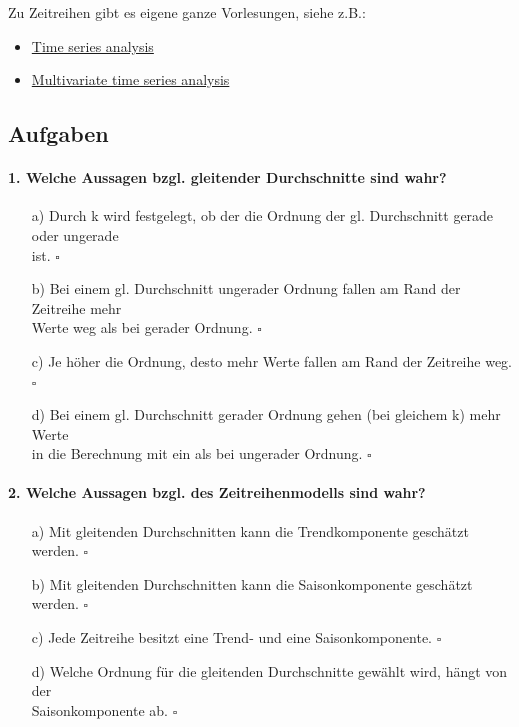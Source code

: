 \documentclass[a4paper]{article}
\begin{document}
Zu Zeitreihen gibt es eigene ganze Vorlesungen, siehe z.B.:

\begin{itemize}
    \item \href{https://www.finmetrics.statistik.uni-muenchen.de/studium_lehre/sommersemester-2020/tsa_19/index.html}{Time series analysis}
    \item \href{https://www.finmetrics.statistik.uni-muenchen.de/studium_lehre/sommersemester-2020/mtsa_2020/index.html}{Multivariate time series analysis}
\end{itemize}

\clearpage

\subsection{Aufgaben}

\paragraph{1. Welche Aussagen bzgl. gleitender Durchschnitte sind wahr?}

\begin{itemize}
    \item[a)] Durch k wird festgelegt, ob der die Ordnung der gl. Durchschnitt gerade oder ungerade\\ist. \hfill $\square$
    \item[b)] Bei einem gl. Durchschnitt ungerader Ordnung fallen am Rand der Zeitreihe mehr\\Werte weg als bei gerader Ordnung. \hfill $\square$
    \item[c)] Je höher die Ordnung, desto mehr Werte fallen am Rand der Zeitreihe weg. \hfill $\square$
    \item[d)] Bei einem gl. Durchschnitt gerader Ordnung gehen (bei gleichem k) mehr Werte\\in die Berechnung mit ein als bei ungerader Ordnung. \hfill $\square$
\end{itemize}

\paragraph{2. Welche Aussagen bzgl. des Zeitreihenmodells sind wahr?}

\begin{itemize}
    \item[a)] Mit gleitenden Durchschnitten kann die Trendkomponente geschätzt werden. \hfill $\square$
    \item[b)] Mit gleitenden Durchschnitten kann die Saisonkomponente geschätzt werden. \hfill $\square$
    \item[c)] Jede Zeitreihe besitzt eine Trend- und eine Saisonkomponente. \hfill $\square$
    \item[d)] Welche Ordnung für die gleitenden Durchschnitte gewählt wird, hängt von der\\Saisonkomponente ab. \hfill $\square$
\end{itemize}
\end{document}
